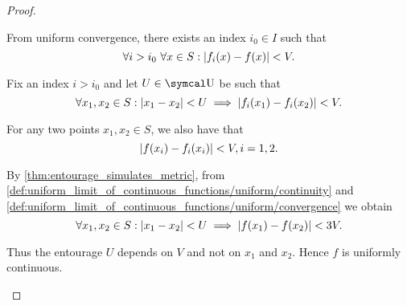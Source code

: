 \begin{proof}
\begin{description}
    From uniform convergence, there exists an index \( i_0 \in I \) such that
    \begin{equation*}
      \forall i > i_0 \ \forall x \in S : \left\vert f_i(x) - f(x) \right\vert < V.
    \end{equation*}

    Fix an index \( i > i_0 \) and let \( U \in \U \) be such that
    \begin{equation}\label{def:uniform_limit_of_continuous_functions/uniform/continuity}
      \forall x_1, x_2 \in S : \left\vert x_1 - x_2 \right\vert < U \implies \left\vert f_i(x_1) - f_i(x_2) \right\vert < V.
    \end{equation}

    For any two points \( x_1, x_2 \in S \), we also have that
    \begin{equation}\label{def:uniform_limit_of_continuous_functions/uniform/convergence}
      \left\vert f(x_i) - f_i(x_i) \right\vert < V, i = 1, 2.
    \end{equation}

    By \cref{thm:entourage_simulates_metric}, from \cref{def:uniform_limit_of_continuous_functions/uniform/continuity} and \cref{def:uniform_limit_of_continuous_functions/uniform/convergence} we obtain
    \begin{equation*}
      \forall x_1, x_2 \in S : \left\vert x_1 - x_2 \right\vert < U \implies \left\vert f(x_1) - f(x_2) \right\vert < 3V.
    \end{equation*}

    Thus the entourage \( U \) depends on \( V \) and not on \( x_1 \) and \( x_2 \). Hence \( f \) is uniformly continuous.
  \end{description}
\end{proof}
